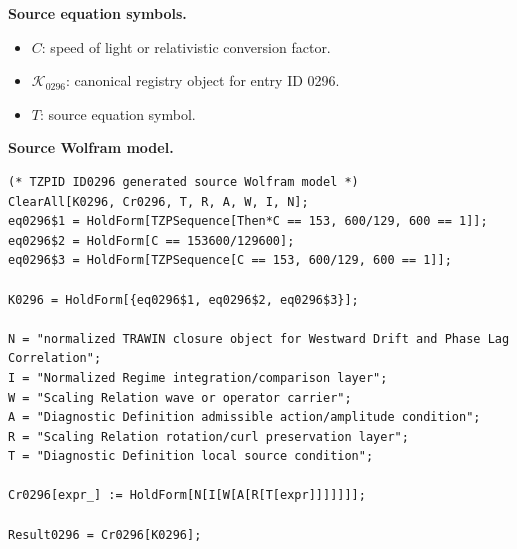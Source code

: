 \begin{minipage}[t]{0.49\linewidth}
\begingroup
\small
\raggedright
\textbf{Source equation symbols.}\par
\begin{itemize}[leftmargin=1.35em,itemsep=1pt,topsep=1pt,parsep=0pt]
    \item $C$: speed of light or relativistic conversion factor.
    \item $\mathcal{K}_{0296}$: canonical registry object for entry ID 0296.
    \item $T$: source equation symbol.
\end{itemize}
\endgroup
\end{minipage}\hfill
\begin{minipage}[t]{0.47\linewidth}
\begingroup
\scriptsize
\raggedright
\textbf{Source Wolfram model.}\par
\begin{Verbatim}[fontsize=\tiny,breaklines=true,breakanywhere=true]
(* TZPID ID0296 generated source Wolfram model *)
ClearAll[K0296, Cr0296, T, R, A, W, I, N];
eq0296$1 = HoldForm[TZPSequence[Then*C == 153, 600/129, 600 == 1]];
eq0296$2 = HoldForm[C == 153600/129600];
eq0296$3 = HoldForm[TZPSequence[C == 153, 600/129, 600 == 1]];

K0296 = HoldForm[{eq0296$1, eq0296$2, eq0296$3}];

N = "normalized TRAWIN closure object for Westward Drift and Phase Lag Correlation";
I = "Normalized Regime integration/comparison layer";
W = "Scaling Relation wave or operator carrier";
A = "Diagnostic Definition admissible action/amplitude condition";
R = "Scaling Relation rotation/curl preservation layer";
T = "Diagnostic Definition local source condition";

Cr0296[expr_] := HoldForm[N[I[W[A[R[T[expr]]]]]]];

Result0296 = Cr0296[K0296];
\end{Verbatim}
\endgroup
\end{minipage}

